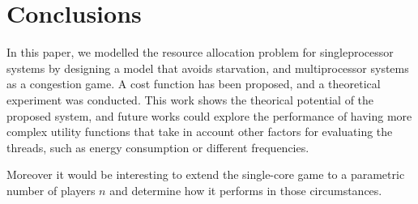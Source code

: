 \section{Conclusions}

In this paper, we modelled the resource allocation problem for singleprocessor
systems by designing a model that avoids starvation, and multiprocessor
systems as a congestion game. A cost function has been proposed, and a
theoretical experiment was conducted. This work shows the theorical potential
of the proposed system, and future works could explore the performance of
having more complex utility functions that take in account other factors for
evaluating the threads, such as energy consumption or different frequencies.

Moreover it would be interesting to extend the single-core game to a
parametric number of players $n$ and determine how it performs in those
circumstances.
